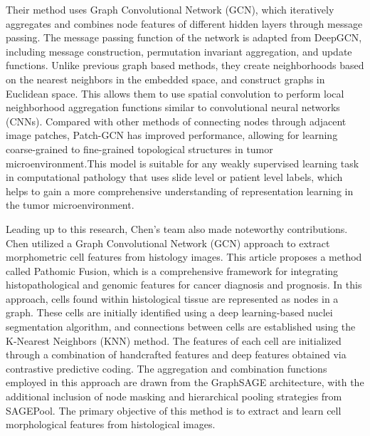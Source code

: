 \documentclass[journal,twoside,web]{ieeecolor}
\begin{document}
Their method uses Graph Convolutional Network (GCN), which iteratively aggregates and combines node features of different hidden layers through message passing. The message passing function of the network is adapted from DeepGCN\cite{li2019deepgcns}, including message construction, permutation invariant aggregation, and update functions. Unlike previous graph based methods, they create neighborhoods based on the nearest neighbors in the embedded space, and construct graphs in Euclidean space. This allows them to use spatial convolution to perform local neighborhood aggregation functions similar to convolutional neural networks (CNNs). Compared with other methods of connecting nodes through adjacent image patches, Patch-GCN has improved performance, allowing for learning coarse-grained to fine-grained topological structures in tumor microenvironment.This model is suitable for any weakly supervised learning task in computational pathology that uses slide level or patient level labels, which helps to gain a more comprehensive understanding of representation learning in the tumor microenvironment.

Leading up to this research, Chen's team also made noteworthy contributions. Chen\cite{chen2020pathomic} utilized a Graph Convolutional Network (GCN) approach to extract morphometric cell features from histology images. This article proposes a method called Pathomic Fusion, which is a comprehensive framework for integrating histopathological and genomic features for cancer diagnosis and prognosis. In this approach, cells found within histological tissue are represented as nodes in a graph. These cells are initially identified using a deep learning-based nuclei segmentation algorithm, and connections between cells are established using the K-Nearest Neighbors (KNN) method. The features of each cell are initialized through a combination of handcrafted features and deep features obtained via contrastive predictive coding. The aggregation and combination functions employed in this approach are drawn from the GraphSAGE architecture, with the additional inclusion of node masking and hierarchical pooling strategies from SAGEPool. The primary objective of this method is to extract and learn cell morphological features from histological images.
\end{document}
